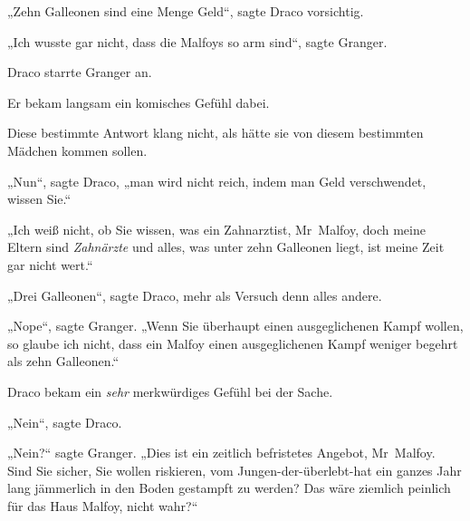 „Zehn Galleonen sind eine Menge Geld“, sagte Draco vorsichtig.

„Ich wusste gar nicht, dass die Malfoys so arm sind“, sagte Granger.

Draco starrte Granger an.

Er bekam langsam ein komisches Gefühl dabei.

Diese bestimmte Antwort klang nicht, als hätte sie von diesem bestimmten Mädchen kommen sollen.

„Nun“, sagte Draco, „man wird nicht reich, indem man Geld verschwendet, wissen Sie.“

„Ich weiß nicht, ob Sie wissen, was ein Zahnarztist, Mr~Malfoy, doch meine Eltern sind \emph{Zahnärzte} und alles, was unter zehn Galleonen liegt, ist meine Zeit gar nicht wert.“

„Drei Galleonen“, sagte Draco, mehr als Versuch denn alles andere.

„Nope“, sagte Granger. „Wenn Sie überhaupt einen ausgeglichenen Kampf wollen, so glaube ich nicht, dass ein Malfoy einen ausgeglichenen Kampf weniger begehrt als zehn Galleonen.“

Draco bekam ein \emph{sehr} merkwürdiges Gefühl bei der Sache.

„Nein“, sagte Draco.

„Nein?“ sagte Granger. „Dies ist ein zeitlich befristetes Angebot, Mr~Malfoy. Sind Sie sicher, Sie wollen riskieren, vom Jungen-der-überlebt-hat ein ganzes Jahr lang jämmerlich in den Boden gestampft zu werden? Das wäre ziemlich peinlich für das Haus Malfoy, nicht wahr?“

